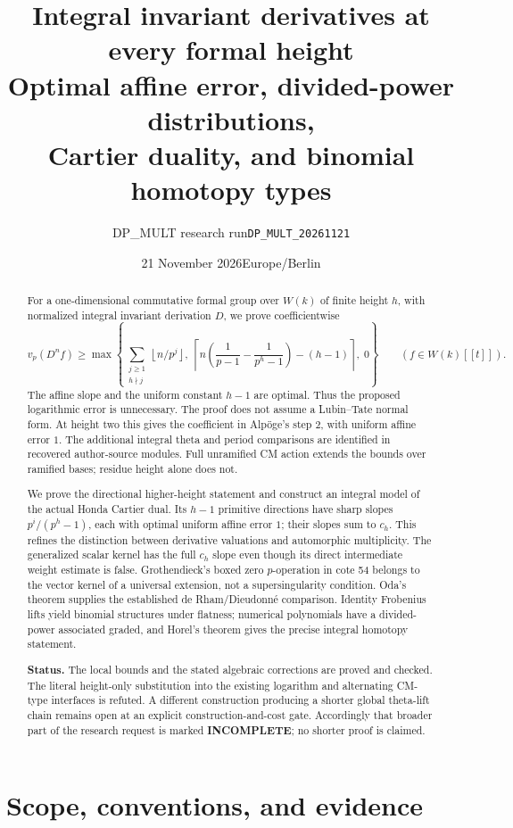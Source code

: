 \documentclass[11pt,a4paper]{article}
\title{Integral invariant derivatives at every formal height\\
\large Optimal affine error, divided-power distributions,\\Cartier duality, and binomial homotopy types}
\author{DP\_MULT research run\quad\texttt{DP\_MULT\_20261121}}
\date{21 November 2026\quad Europe/Berlin}
\theoremstyle{definition}\newtheorem{remark}[theorem]{Remark}
\newcommand{\vp}{v_p}\newcommand{\dR}{\mathrm{dR}}\newcommand{\crys}{\mathrm{crys}}
\newcommand{\ceil}[1]{\left\lceil #1\right\rceil}\newcommand{\floor}[1]{\left\lfloor #1\right\rfloor}
\begin{document}
\maketitle
\begin{abstract}
For a one-dimensional commutative formal group over $W(k)$ of finite height $h$, with normalized integral invariant derivation $D$, we prove coefficientwise
\[
 \vp(D^n f)\ge
 \max\left\{\sum_{\substack{j\ge1\\h\nmid j}}\floor{n/p^j},\;
 \ceil{n\left(\frac1{p-1}-\frac1{p^h-1}\right)-(h-1)},\;0\right\}
 \qquad(f\in W(k)[[t]]).
\]
The affine slope and the uniform constant $h-1$ are optimal. Thus the proposed logarithmic error is unnecessary. The proof does not assume a Lubin--Tate normal form. At height two this gives the coefficient in Alp\"oge's step 2, with uniform affine error $1$. The additional integral theta and period comparisons are identified in recovered author-source modules. Full unramified CM action extends the bounds over ramified bases; residue height alone does not.

We prove the directional higher-height statement and construct an integral model of the actual Honda Cartier dual. Its $h-1$ primitive directions have sharp slopes $p^i/(p^h-1)$, each with optimal uniform affine error $1$; their slopes sum to $c_h$. This refines the distinction between derivative valuations and automorphic multiplicity. The generalized scalar kernel has the full $c_h$ slope even though its direct intermediate weight estimate is false. Grothendieck's boxed zero $p$-operation in cote 54 belongs to the vector kernel of a universal extension, not a supersingularity condition. Oda's theorem supplies the established de Rham/Dieudonn\'e comparison. Identity Frobenius lifts yield binomial structures under flatness; numerical polynomials have a divided-power associated graded, and Horel's theorem gives the precise integral homotopy statement.

\textbf{Status.} The local bounds and the stated algebraic corrections are proved and checked. The literal height-only substitution into the existing logarithm and alternating CM-type interfaces is refuted. A different construction producing a shorter global theta-lift chain remains open at an explicit construction-and-cost gate. Accordingly that broader part of the research request is marked \textbf{INCOMPLETE}; no shorter proof is claimed.
\end{abstract}
\tableofcontents
\newpage

\section{Scope, conventions, and evidence}
\end{document}

